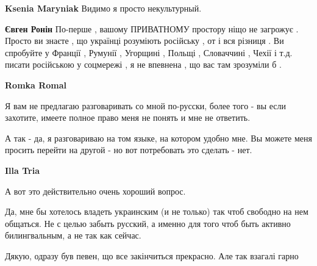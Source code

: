 \begin{itemize}
\begin{itemize}
\textbf{Ksenia Maryniak} Видимо я просто некультурный.

 
\textbf{Євген Ронін} По-перше , вашому ПРИВАТНОМУ простору ніщо не загрожує .
Просто ви знаєте , що українці розуміють російську , от і вся різниця . Ви
спробуйте у Франції , Румунії , Угорщині , Польщі , Словаччині , Чехії і т.д.
писати російською у соцмережі , я не впевнена , що вас там зрозуміли б .

 
\textbf{Romka Romal} 

Я вам не предлагаю разговаривать со мной по-русски, более того - вы если
захотите, имеете полное право меня не понять и мне не ответить.

А так - да, я разговариваю на том языке, на котором удобно мне. Вы можете меня
просить перейти на другой - но вот потребовать это сделать - нет.


 
\textbf{Illa Tria} 

А вот это действительно очень хороший вопрос.

Да, мне бы хотелось владеть украинским (и не только) так чтоб свободно на нем
общаться. Не с целью забыть русский, а именно для того чтоб быть активно
билингвальным, а не так как сейчас.

\end{itemize}

 
Дякую, одразу був певен, що все закінчиться прекрасно. Але так взагалі гарно


\end{itemize}
